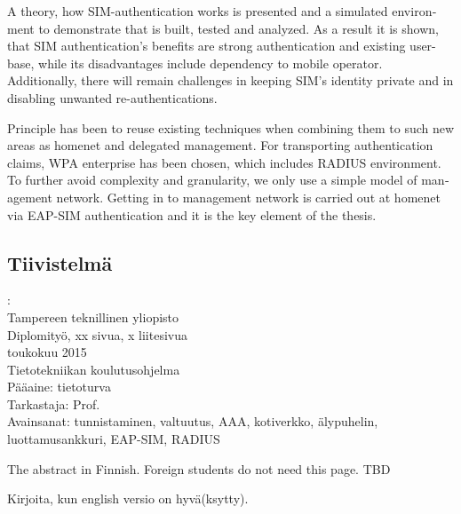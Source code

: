 \documentclass[12pt,a4paper,english]{tutthesis}
\begin{document}
\begin{otherlanguage}{english}
A theory, how SIM-authentication works is presented and a simulated environment
to demonstrate that is built, tested and analyzed.
As a result it is shown, that SIM authentication's benefits are strong
authentication and existing user-base, while its disadvantages include
dependency to mobile operator. Additionally, there will remain challenges in keeping SIM's identity private and in disabling unwanted re-authentications.

Principle has been to reuse existing techniques when combining them to such new areas as homenet and delegated management.
 For transporting authentication claims, WPA enterprise has been chosen, which includes RADIUS environment.
To further avoid complexity and granularity, we
only use a simple model of management network. Getting in to management network is carried out at homenet via EAP-SIM authentication and it is the key element of the thesis.



\end{otherlanguage} %

\begin{otherlanguage}{finnish} %
\chapter*{Tiivistelmä}         %

\begin{spacing}{1.0}
         {\bf \textsf{\MakeUppercase{\@author}}}: \@titleB\\  %
         \textsf{Tampereen teknillinen yliopisto}\\
         \textsf{Diplomityö, xx sivua, x liitesivua}\\ %
         \textsf{toukokuu 2015}\\
         \textsf{Tietotekniikan koulutusohjelma}\\
         \textsf{Pääaine: tietoturva}\\
         \textsf{Tarkastaja:  Prof. \@examiner}\\ %
         \textsf{Avainsanat: tunnistaminen, valtuutus, AAA, kotiverkko, älypuhelin, luottamusankkuri, EAP-SIM, RADIUS}\\
\end{spacing}
The abstract in Finnish. Foreign students do not need this page.
TBD

Kirjoita, kun english versio on hyvä(ksytty).
\end{otherlanguage} %
\end{document}
